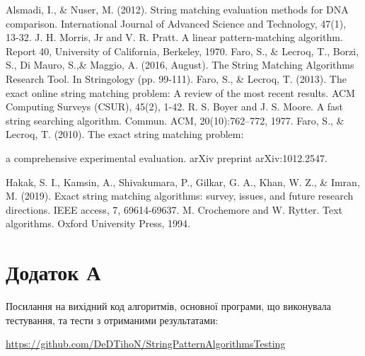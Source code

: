 \documentclass[a4paper,14pt]{extarticle} %
\begin{document}
    \newpage
    
    \begin{thebibliography}{9}
		Alsmadi, I., \& Nuser, M. (2012). String matching evaluation methods for DNA comparison. International Journal of Advanced Science and Technology, 47(1), 13-32.
		J. H. Morris, Jr and V. R. Pratt. A linear pattern-matching algorithm. Report 40, University of California, Berkeley, 1970.
		Faro, S., \& Lecroq, T., Borzi, S., Di Mauro, S.,\& Maggio, A. (2016, August). The String Matching Algorithms Research Tool. In Stringology (pp. 99-111).
		Faro, S., \& Lecroq, T. (2013). The exact online string matching problem: A review of the most recent results. ACM Computing Surveys (CSUR), 45(2), 1-42.
		R. S. Boyer and J. S. Moore. A fast string searching algorithm. Commun.
ACM, 20(10):762–772, 1977.
		Faro, S., \& Lecroq, T. (2010). The exact string matching problem:
		
		a comprehensive experimental evaluation. arXiv preprint arXiv:1012.2547.

		Hakak, S. I., Kamsin, A., Shivakumara, P., Gilkar, G. A., Khan, W. Z., \& Imran, M. (2019). Exact string matching algorithms: survey, issues, and future research directions. IEEE access, 7, 69614-69637.
		M. Crochemore and W. Rytter. Text algorithms. Oxford University Press,
1994.

    \end{thebibliography}
    
	\newpage

	\section*{Додаток А}

	Посилання на вихідний код алгоритмів, основної програми, що виконувала тестування, та тести з отриманими результатами:

	\small{\url{https://github.com/DeDTihoN/StringPatternAlgorithmsTesting}}
\end{document}
